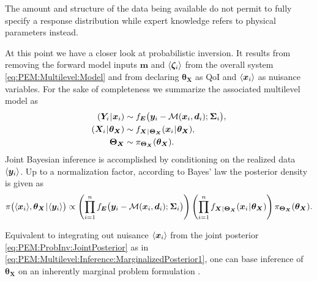 The amount and structure of the data being available do not permit to fully specify a response distribution while expert knowledge refers to physical parameters instead.
\par %
At this point we have a closer look at probabilistic inversion.
It results from removing the forward model inputs \(\bm{m}\) and \(\langle{\bm{\zeta}_i}\rangle\) from the overall system \cref{eq:PEM:Multilevel:Model}
and from declaring \(\bm{\theta}_{\bm{X}}\) as QoI and \(\langle{\bm{x}_i}\rangle\) as nuisance variables.
For the sake of completeness we summarize the associated multilevel model as
\begin{subequations} \label{eq:PEM:ProbInv:Model}
  \begin{align}
    (\bm{Y}_i \cond \bm{x}_i) &\sim f_{\bm{E}} \big( \bm{y}_i-\mathcal{M}(\bm{x}_i,\bm{d}_i) \distparam \bm{\Sigma}_i \big), \label{eq:PEM:ProbInv:Model:Data}\\
    (\bm{X}_i \cond \bm{\theta}_{\bm{X}} ) &\sim f_{\bm{X} \cond \bm{\Theta}_{\bm{X}}} (\bm{x}_i \cond \bm{\theta}_{\bm{X}}), \label{eq:PEM:ProbInv:Model:StructuralPrior}\\
    \bm{\Theta}_{\bm{X}} &\sim \pi_{\bm{\Theta}_{\bm{X}}} (\bm{\theta}_{\bm{X}}). \label{eq:PEM:ProbInv:Model:Hyperprior}
  \end{align}
\end{subequations}
Joint Bayesian inference is accomplished by conditioning on the realized data \(\langle{\bm{y}_i}\rangle\).
Up to a normalization factor, according to Bayes' law the posterior density is given as
\begin{equation} \label{eq:PEM:ProbInv:JointPosterior}
  \pi \big( \langle{\bm{x}_i}\rangle,\bm{\theta}_{\bm{X}} {\:\!}|{\:\!} \langle{\bm{y}_i}\rangle \big)
  \propto \left( \prod\limits_{i=1}^n f_{\bm{E}} \big( \bm{y}_i-\mathcal{M}(\bm{x}_i,\bm{d}_i) ;{\:\!} \bm{\Sigma}_i \big) \right)
  \left( \prod\limits_{i=1}^n f_{\bm{X} {\:\!}|{\:\!} \bm{\Theta}_{\bm{X}}} (\bm{x}_i {\:\!}|{\:\!} \bm{\theta}_{\bm{X}}) \right)  \pi_{\bm{\Theta}_{\bm{X}}}(\bm{\theta}_{\bm{X}}).
\end{equation}
\par %
Equivalent to integrating out nuisance \(\langle{\bm{x}_i}\rangle\) from the joint posterior \cref{eq:PEM:ProbInv:JointPosterior} as in \cref{eq:PEM:Multilevel:Inference:MarginalizedPosterior1},
one can base inference of \(\bm{\theta}_{\bm{X}}\) on an inherently marginal problem formulation \cite{Multilevel:Rocquigny2009,Uncertainty:Rocquigny2012}.
